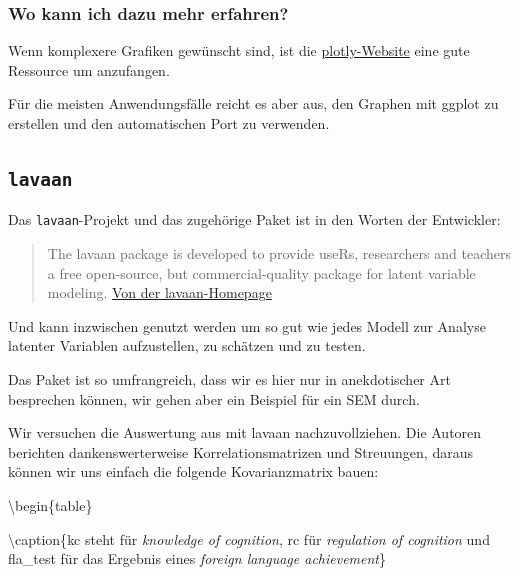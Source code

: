 \documentclass[
]{book}
\begin{document}
\hypertarget{htmlwidget-7f79be3dff95dfd35684}{}

\hypertarget{wo-kann-ich-dazu-mehr-erfahren-3}{%
\subsubsection{Wo kann ich dazu mehr erfahren?}\label{wo-kann-ich-dazu-mehr-erfahren-3}}

Wenn komplexere Grafiken gewünscht sind, ist die \href{https://plotly.com/r/}{plotly-Website} eine gute Ressource um anzufangen.

Für die meisten Anwendungsfälle reicht es aber aus, den Graphen mit ggplot zu erstellen und den automatischen Port zu verwenden.

\hypertarget{lavaan}{%
\subsection{\texorpdfstring{\texttt{lavaan}}{lavaan}}\label{lavaan}}

Das \texttt{lavaan}-Projekt und das zugehörige Paket ist in den Worten der Entwickler:

\begin{quote}
The lavaan package is developed to provide useRs, researchers and teachers a free open-source, but commercial-quality package for latent variable modeling. \href{https://lavaan.ugent.be/index.html}{Von der lavaan-Homepage}
\end{quote}

Und kann inzwischen genutzt werden um so gut wie jedes Modell zur Analyse latenter Variablen aufzustellen, zu schätzen und zu testen.

Das Paket ist so umfrangreich, dass wir es hier nur in anekdotischer Art besprechen können, wir gehen aber ein Beispiel für ein SEM durch.

Wir versuchen die Auswertung aus \citet{pishghadamIntelligenceMetacognitionPredictors2013} mit lavaan nachzuvollziehen. Die Autoren berichten dankenswerterweise Korrelationsmatrizen und Streuungen, daraus können wir uns einfach die folgende Kovarianzmatrix bauen:

\textbackslash begin\{table\}

\textbackslash caption\{\label{tab:unnamed-chunk-133}kc steht für \emph{knowledge of cognition}, rc für \emph{regulation of cognition} und fla\_test für das Ergebnis eines \emph{foreign language achievement}\}
\centering
\end{document}
